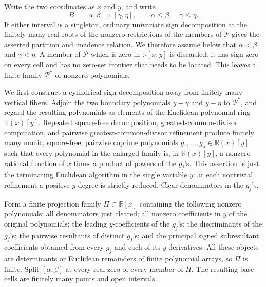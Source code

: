 Write the two coordinates as \(x\) and \(y\), and write
\[
B=[\alpha,\beta]\times[\gamma,\eta],
\qquad \alpha\leq\beta,\quad \gamma\leq\eta.
\]
If either interval is a singleton, ordinary univariate sign decomposition at the finitely many real roots of the nonzero restrictions of the members of \(\mathscr P\) gives the asserted partition and incidence relation.  We therefore assume below that \(\alpha<\beta\) and \(\gamma<\eta\).  A member of \(\mathscr P\) which is zero in \(\mathbb R[x,y]\) is discarded: it has sign zero on every cell and has no zero-set frontier that needs to be located.  This leaves a finite family \(\mathscr P^{*}\) of nonzero polynomials.

We first construct a cylindrical sign decomposition away from finitely many vertical fibers.  Adjoin the two boundary polynomials \(y-\gamma\) and \(y-\eta\) to \(\mathscr P^{*}\), and regard the resulting polynomials as elements of the Euclidean polynomial ring \(\mathbb R(x)[y]\).  Repeated square-free decomposition, greatest-common-divisor computation, and pairwise greatest-common-divisor refinement produce finitely many monic, square-free, pairwise coprime polynomials \(g_1,\ldots,g_J\in\mathbb R(x)[y]\) such that every polynomial in the enlarged family is, in \(\mathbb R(x)[y]\), a nonzero rational function of \(x\) times a product of powers of the \(g_j\)'s.  This assertion is just the terminating Euclidean algorithm in the single variable \(y\): at each nontrivial refinement a positive \(y\)-degree is strictly reduced.  Clear denominators in the \(g_j\)'s.

Form a finite projection family \(\Pi\subset\mathbb R[x]\) containing the following nonzero polynomials: all denominators just cleared; all nonzero coefficients in \(y\) of the original polynomials; the leading \(y\)-coefficients of the \(g_j\)'s; the discriminants of the \(g_j\)'s; the pairwise resultants of distinct \(g_j\)'s; and the principal signed subresultant coefficients obtained from every \(g_j\) and each of its \(y\)-derivatives.  All these objects are determinants or Euclidean remainders of finite polynomial arrays, so \(\Pi\) is finite.  Split \([\alpha,\beta]\) at every real zero of every member of \(\Pi\).  The resulting base cells are finitely many points and open intervals.

